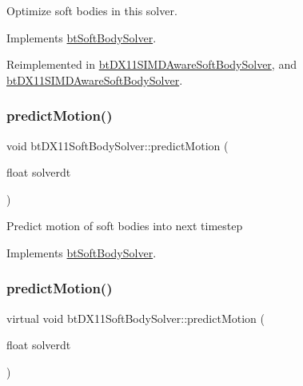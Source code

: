 Optimize soft bodies in this solver. 

Implements \hyperlink{classbtSoftBodySolver_af07da1ec6f11e7873bc5fafef426fcd3}{bt\+Soft\+Body\+Solver}.



Reimplemented in \hyperlink{classbtDX11SIMDAwareSoftBodySolver_a575cf63485ef6a9a55f045e13dcb7717}{bt\+D\+X11\+S\+I\+M\+D\+Aware\+Soft\+Body\+Solver}, and \hyperlink{classbtDX11SIMDAwareSoftBodySolver_a438ad9c2749189a20c5c950023893f76}{bt\+D\+X11\+S\+I\+M\+D\+Aware\+Soft\+Body\+Solver}.

\mbox{\label{classbtDX11SoftBodySolver_a2565453dfc806f819746d7bc04a57a96}} 
\subsubsection{\texorpdfstring{predict\+Motion()}{predictMotion()}\hspace{0.1cm}{\footnotesize\ttfamily [1/2]}}
{\footnotesize\ttfamily void bt\+D\+X11\+Soft\+Body\+Solver\+::predict\+Motion (\begin{DoxyParamCaption}\item[{float}]{solverdt }\end{DoxyParamCaption})\hspace{0.3cm}{\ttfamily [virtual]}}

Predict motion of soft bodies into next timestep 

Implements \hyperlink{classbtSoftBodySolver_a72f0c095ae30002a6f98fc194a63e1ba}{bt\+Soft\+Body\+Solver}.

\mbox{\label{classbtDX11SoftBodySolver_a408e312da4af3721c9f3e0a5e2c2473d}} 
\subsubsection{\texorpdfstring{predict\+Motion()}{predictMotion()}\hspace{0.1cm}{\footnotesize\ttfamily [2/2]}}
{\footnotesize\ttfamily virtual void bt\+D\+X11\+Soft\+Body\+Solver\+::predict\+Motion (\begin{DoxyParamCaption}\item[{float}]{solverdt }\end{DoxyParamCaption})\hspace{0.3cm}{\ttfamily [virtual]}}

